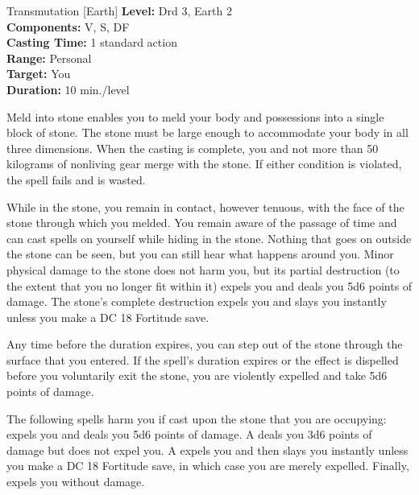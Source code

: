 {Transmutation [Earth]}
{
	\textbf{Level:}
	Drd 3, Earth 2\\
	\textbf{Components:}
	V, S, DF\\
	\textbf{Casting Time:}
	1 standard action\\
	\textbf{Range:}
	Personal\\
	\textbf{Target:}
	You\\
	\textbf{Duration:}
	10 min./level\\
}
{
	Meld into stone enables you to meld your body and possessions into a single block of stone. The stone must be large enough to accommodate your body in all three dimensions. When the casting is complete, you and not more than 50 kilograms of nonliving gear merge with the stone. If either condition is violated, the spell fails and is wasted.

	While in the stone, you remain in contact, however tenuous, with the face of the stone through which you melded. You remain aware of the passage of time and can cast spells on yourself while hiding in the stone. Nothing that goes on outside the stone can be seen, but you can still hear what happens around you. Minor physical damage to the stone does not harm you, but its partial destruction (to the extent that you no longer fit within it) expels you and deals you 5d6 points of damage. The stone's complete destruction expels you and slays you instantly unless you make a DC 18 Fortitude save.

	Any time before the duration expires, you can step out of the stone through the surface that you entered. If the spell's duration expires or the effect is dispelled before you voluntarily exit the stone, you are violently expelled and take 5d6 points of damage.

	The following spells harm you if cast upon the stone that you are occupying:  expels you and deals you 5d6 points of damage. A  deals you 3d6 points of damage but does not expel you. A  expels you and then slays you instantly unless you make a DC 18 Fortitude save, in which case you are merely expelled. Finally,  expels you without damage.

}
